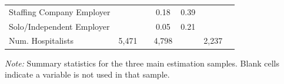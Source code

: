 \begin{table}[ht!]
\begin{tabular}[t]{lcccccc}
\hspace{1em}Staffing Company Employer &  &  & 0.18 & 0.39 &  & \\
\hspace{1em}Solo/Independent Employer &  &  & 0.05 & 0.21 &  & \\
\addlinespace[0.3em]
Num. Hospitalists & 5,471 &  & 4,798 &  & 2,237 & \\
\bottomrule
\end{tabular}
\begin{tablenotes}
\item \textit{Note: } Summary statistics for the three main estimation samples. Blank cells indicate a variable is not used in that sample.
\end{tablenotes}
\end{table}

